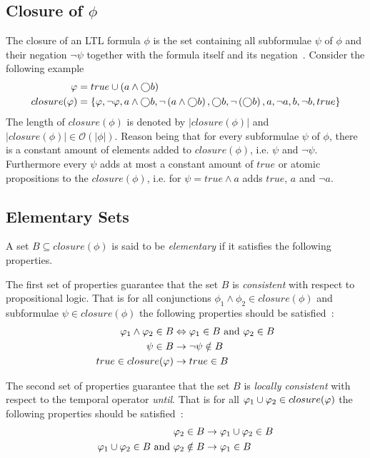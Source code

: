 \subsection{Closure of $\phi$}
The closure of an LTL formula $\phi$ is the set containing all subformulae $\psi$ of $\phi$ and their negation $\lnot \psi$ together with the formula itself and its negation~\cite[def. 5.34]{baier2008principles}. Consider the following example
\begin{align*}
    \varphi &= true \cup \left( a \land \bigcirc b \right) \\
    closure(\varphi) &= \left\{ \varphi, \lnot \varphi, a \land \bigcirc b, \lnot \left( a \land \bigcirc b \right), \bigcirc b, \lnot \left( \bigcirc b \right), a, \lnot a, b, \lnot b, true \right\}
\end{align*}
The length of $closure(\phi)$ is denoted by $|closure(\phi)|$ and $|closure(\phi)| \in \mathcal{O}\left(|\phi|\right)$. Reason being that for every subformulae $\psi$ of $\phi$, there is a constant amount of elements added to $closure(\phi)$, i.e. $\psi$ and $\lnot \psi$. Furthermore every $\psi$ adds at most a constant amount of $true$ or atomic propositions to the $closure(\phi)$, i.e. for $\psi = true \land a$ adds $true$, $a$ and $\lnot a$.

\subsection{Elementary Sets}
\label{sec:elemesets}
A set $B \subseteq closure(\phi)$ is said to be \emph{elementary} if it satisfies the following properties.

The first set of properties guarantee that the set $B$ is \emph{consistent} with respect to propositional logic. That is for all conjunctions $\phi_1 \land \phi_2 \in closure(\phi)$ and subformulae $\psi \in closure(\phi)$ the following properties should be satisfied~\cite{baier2008principles}:
\begin{align}
    \varphi_1 \land \varphi_2 \in B &\Leftrightarrow \varphi_1 \in B \text{ and } \varphi_2 \in B \label{eq:elem1.1} \\
    \psi \in B &\rightarrow \lnot \psi \notin B \label{eq:elem1.2} \\
    true \in closure(\varphi) &\rightarrow true \in B \label{eq:elem1.3}
\end{align}

The second set of properties guarantee that the set $B$ is \emph{locally consistent} with respect to the temporal operator \emph{until}. That is for all $\varphi_1 \cup \varphi_2 \in closure(\varphi)$ the following properties should be satisfied~\cite{baier2008principles}:
\begin{align}
    \varphi_2 \in B &\rightarrow \varphi_1 \cup \varphi_2 \in B \label{eq:elem2.1} \\
    \varphi_1 \cup \varphi_2 \in B \text{ and } \varphi_2 \notin B &\rightarrow \varphi_1 \in B \label{eq:elem2.2}
\end{align}

